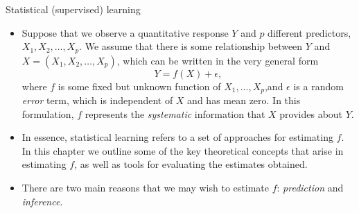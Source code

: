 \documentclass[10pt,a4paper]{beamer}
\begin{document}
\begin{frame}{Statistical (supervised) learning}

\begin{itemize}\small
  \item Suppose that we observe a quantitative response $Y$ and $p$
different predictors, $X_1,X_2,\dots,X_p$. We assume that there is some
relationship between $Y$ and $X =(X_1,X_2,\dots,X_p)$, which can be written
in the very general form
\begin{equation}\label{model}
  Y = f(X) + \epsilon,
\end{equation}
where $f$ is some fixed but unknown function of $X_1,\dots,X_p$,and $\epsilon$ is a random
\emph{error} term, which is independent of $X$ and has mean zero. In this formulation, $f$ represents the \emph{systematic} information that $X$ provides about $Y$.
\item In essence, statistical learning refers to a set of approaches for estimating
$f$. In this chapter we outline some of the key theoretical concepts that arise
in estimating $f$, as well as tools for evaluating the estimates obtained.
\item There are two main reasons that we may wish to estimate $f$: \emph{prediction}
and \emph{inference}.
\end{itemize}

\end{frame}
\end{document}
